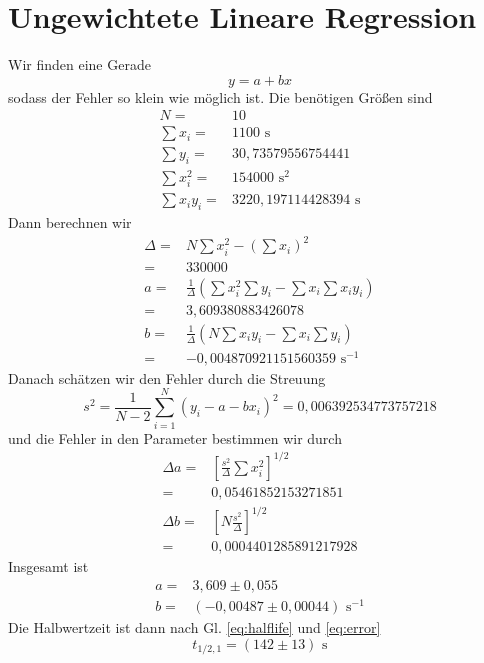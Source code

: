 \documentclass[prb,12pt]{revtex4-2}
\theoremstyle{definition}
\theoremstyle{definition}
\begin{document}
\section{Ungewichtete Lineare Regression}\label{sec:unweightedreg}
Wir finden eine Gerade
\[y=a+bx\]
sodass der Fehler so klein wie möglich ist. Die benötigen Größen sind
\begin{align*}
	N=&10\\
	\sum x_i=&1100\text{ s}\\
	\sum y_i=&30,73579556754441\\
	\sum x_i^2=&154000\text{ s}^2\\
	\sum x_i y_i=&3220,197114428394\text{ s}
\end{align*}
Dann berechnen wir
\begin{align*}
	\Delta =& N\sum x_i^2- (\sum x_i)^2\\
	=&330000\\
	a=&\frac 1\Delta(\sum x_i^2 \sum y_i-\sum x_i \sum x_i y_i)\\
	=& 3,609380883426078\\
	b=&\frac 1\Delta (N \sum x_i y_i - \sum x_i \sum y_i)\\
	=&-0,004870921151560359\text{ s}^{-1}
\end{align*}
Danach schätzen wir den Fehler durch die Streuung
\[s^2=\frac{1}{N-2}\sum_{i=1}^N (y_i - a - bx_i)^2=0,006392534773757218\]
und die Fehler in den Parameter bestimmen wir durch
\begin{align*}
	\Delta a=&\left[\frac{s^2}{\Delta}\sum x_i^2\right]^{1/2}\\
	=&0,05461852153271851\\
	\Delta b =&\left[N\frac{s^2}{\Delta}\right]^{1/2}\\
	=&0,0004401285891217928
\end{align*}
Insgesamt ist
\begin{align*}
	a=&3,609\pm 0,055\\
	b=&(-0,00487\pm 0,00044)\text{ s}^{-1}
\end{align*}
Die Halbwertzeit ist dann nach Gl. \eqref{eq:halflife} und \eqref{eq:error}
\[t_{1/2,1}=(142\pm 13)\text{ s}\]
\end{document}
